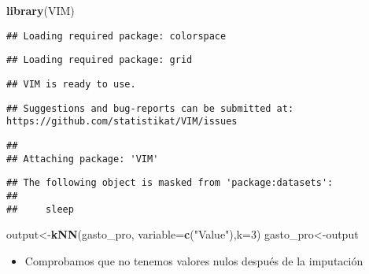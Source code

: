 \documentclass[]{article}
\newenvironment{Shaded}{\begin{snugshade}}{\end{snugshade}}
\newcommand{\DataTypeTok}[1]{\textcolor[rgb]{0.13,0.29,0.53}{#1}}
\newcommand{\DecValTok}[1]{\textcolor[rgb]{0.00,0.00,0.81}{#1}}
\newcommand{\KeywordTok}[1]{\textcolor[rgb]{0.13,0.29,0.53}{\textbf{#1}}}
\newcommand{\NormalTok}[1]{#1}
\newcommand{\StringTok}[1]{\textcolor[rgb]{0.31,0.60,0.02}{#1}}
\providecommand{\tightlist}{%
  \setlength{\itemsep}{0pt}\setlength{\parskip}{0pt}}
\begin{document}
\begin{Shaded}
\begin{Highlighting}[]
\KeywordTok{library}\NormalTok{(VIM)}
\end{Highlighting}
\end{Shaded}

\begin{verbatim}
## Loading required package: colorspace
\end{verbatim}

\begin{verbatim}
## Loading required package: grid
\end{verbatim}

\begin{verbatim}
## VIM is ready to use.
\end{verbatim}

\begin{verbatim}
## Suggestions and bug-reports can be submitted at: https://github.com/statistikat/VIM/issues
\end{verbatim}

\begin{verbatim}
## 
## Attaching package: 'VIM'
\end{verbatim}

\begin{verbatim}
## The following object is masked from 'package:datasets':
## 
##     sleep
\end{verbatim}

\begin{Shaded}
\begin{Highlighting}[]
\NormalTok{output<-}\KeywordTok{kNN}\NormalTok{(gasto_pro, }\DataTypeTok{variable=}\KeywordTok{c}\NormalTok{(}\StringTok{"Value"}\NormalTok{),}\DataTypeTok{k=}\DecValTok{3}\NormalTok{) }
\NormalTok{gasto_pro<-output}
\end{Highlighting}
\end{Shaded}

\begin{itemize}
\tightlist
\item
  Comprobamos que no tenemos valores nulos después de la imputación
\end{itemize}
\end{document}
